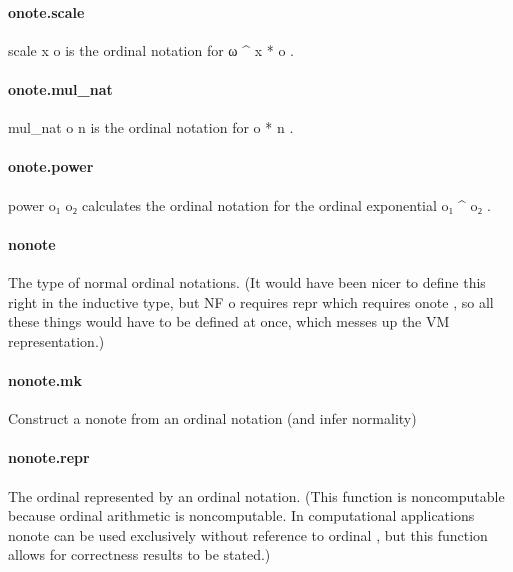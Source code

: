 \documentclass{article}
\begin{document}
\paragraph{onote.scale}
\par
\colorbox[RGB]{253,246,227}{{{{\color[RGB]{101, 123, 131} scale x o }}}} is the ordinal notation for 
\colorbox[RGB]{253,246,227}{{{{\color[RGB]{101, 123, 131} ω \textasciicircum{} x  }}}{{{\color[RGB]{181, 137, 0} * }}}{{{\color[RGB]{101, 123, 131}  o }}}}.
\paragraph{onote.mul\_nat}
\par
\colorbox[RGB]{253,246,227}{{{{\color[RGB]{101, 123, 131} mul\_nat o n }}}} is the ordinal notation for 
\colorbox[RGB]{253,246,227}{{{{\color[RGB]{101, 123, 131} o  }}}{{{\color[RGB]{181, 137, 0} * }}}{{{\color[RGB]{101, 123, 131}  n }}}}.
\paragraph{onote.power}
\par
\colorbox[RGB]{253,246,227}{{{{\color[RGB]{101, 123, 131} power o₁ o₂ }}}} calculates the ordinal notation for
the ordinal exponential 
\colorbox[RGB]{253,246,227}{{{{\color[RGB]{101, 123, 131} o₁ \textasciicircum{} o₂ }}}}.
\paragraph{nonote}
\par
The type of normal ordinal notations. (It would have been
nicer to define this right in the inductive type, but 
\colorbox[RGB]{253,246,227}{{{{\color[RGB]{101, 123, 131} NF o }}}}requires 
\colorbox[RGB]{253,246,227}{{{{\color[RGB]{101, 123, 131} repr }}}} which requires 
\colorbox[RGB]{253,246,227}{{{{\color[RGB]{101, 123, 131} onote }}}}, so all these things
would have to be defined at once, which messes up the VM
representation.)
\paragraph{nonote.mk}
\par
Construct a 
\colorbox[RGB]{253,246,227}{{{{\color[RGB]{101, 123, 131} nonote }}}} from an ordinal notation
(and infer normality)
\paragraph{nonote.repr}
\par
The ordinal represented by an ordinal notation.
(This function is noncomputable because ordinal
arithmetic is noncomputable. In computational applications
\colorbox[RGB]{253,246,227}{{{{\color[RGB]{101, 123, 131} nonote }}}} can be used exclusively without reference
to 
\colorbox[RGB]{253,246,227}{{{{\color[RGB]{101, 123, 131} ordinal }}}}, but this function allows for correctness
results to be stated.)
\end{document}
